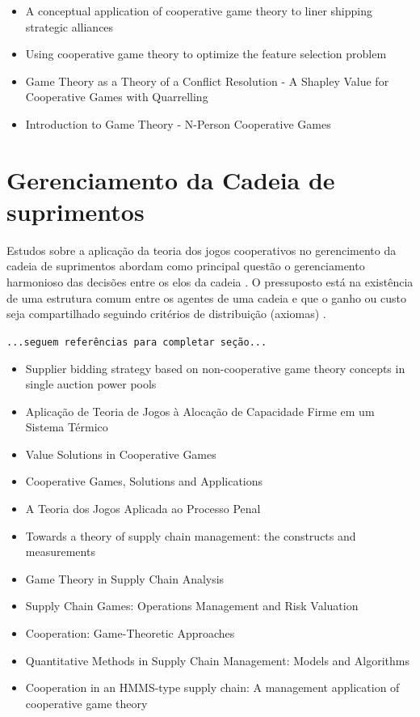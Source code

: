 \documentclass[
	article,			        %
	11pt,				          %
	oneside,			        %
	a4paper,			        %
	english,			        %
	brazil,				        %
	sumario=tradicional
]{abntex2}\usepackage[]{graphicx}\usepackage[]{color}
\begin{document}
\begin{itemize}
    \item A conceptual application of cooperative game theory to liner shipping strategic alliances \cite{Song.2002}
    \item Using cooperative game theory to optimize the feature selection problem \cite{Sun.2012}
    \item Game Theory as a Theory of a Conflict Resolution - A Shapley Value for Cooperative Games with Quarrelling \cite{Rapoport.1974}
    \item Introduction to Game Theory - N-Person Cooperative Games \cite{Morris.1994}    
  \end{itemize}
  
\section{Gerenciamento da Cadeia de suprimentos}

Estudos sobre a aplicação da teoria dos jogos cooperativos no gerencimento da cadeia de suprimentos abordam como principal questão o gerenciamento harmonioso das decisões entre os elos da cadeia \cite{Dobos.2010a}. O pressuposto está na existência de uma estrutura comum entre os agentes de uma cadeia e que o ganho ou custo seja compartilhado seguindo critérios de distribuição (axiomas) \cite{Bezerra.2009}.

  \texttt{\color{red}...seguem referências para completar seção...}
  \begin{itemize}
    \item Supplier bidding strategy based on non-cooperative game theory concepts in single auction power pools \cite{Kang.2007}
    \item Aplicação de Teoria de Jogos à Alocação de Capacidade Firme em um Sistema Térmico \cite{Ayala.2008}
    \item Value Solutions in Cooperative Games \cite{Mccain.2013} 
    \item Cooperative Games, Solutions and Applications \cite{Driessen.2013}
    \item A Teoria dos Jogos Aplicada ao Processo Penal \cite{Rosa.2014}
    \item Towards a theory of supply chain management: the constructs and measurements \cite{Chen.2004}
    \item Game Theory in Supply Chain Analysis \cite{Cachon.2004}
    \item Supply Chain Games: Operations Management and Risk Valuation \cite{kogan.2007}
    \item Cooperation: Game-Theoretic Approaches \cite{Hart.2012}
    \item Quantitative Methods in Supply Chain Management: Models and Algorithms \cite{Christou.2012}
    \item Cooperation in an HMMS-type supply chain: A management application of cooperative game theory \cite{Dobos.2010b}
  \end{itemize}
\end{document}
